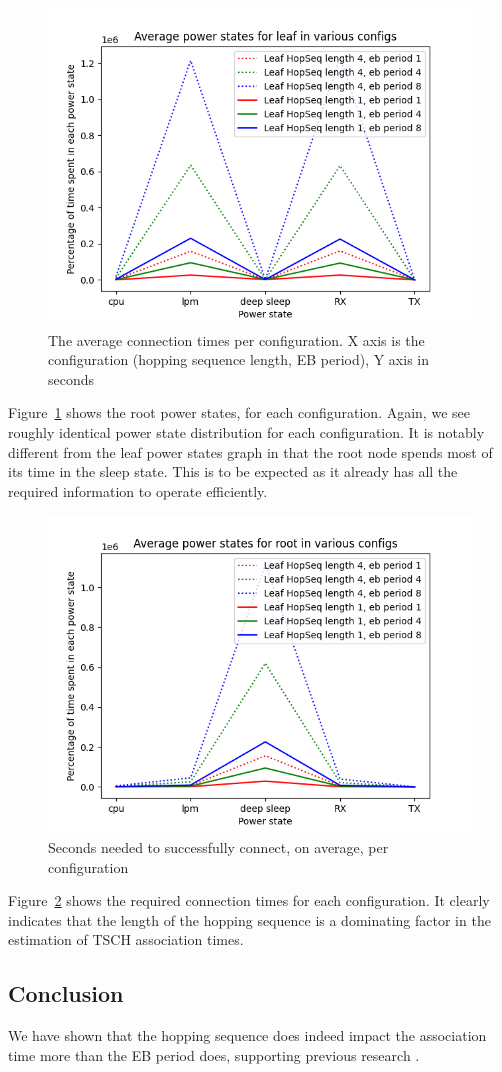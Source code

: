\documentclass[conference]{IEEEtran}
\newcommand{\figref}[1]{Figure~\ref{#1}}
\renewcommand\_{\textunderscore\allowbreak}
\begin{document}
\begin{figure}[htbp]
	\centering
	\includegraphics[width=.48\textwidth,keepaspectratio]{figures/leaf_powerstates}
	\caption{The average connection times per configuration. X axis is the configuration (hopping sequence length, EB period), Y axis in seconds}
	\label{fig:t2root}
\end{figure}

\figref{fig:t2root} shows the root power states, for each configuration. Again, we see roughly identical power state distribution for each configuration. It is notably different from the leaf power states graph in that the root node spends most of its time in the sleep state. This is to be expected as it already has all the required information to operate efficiently. 

\begin{figure}[htbp]
	\centering
	\includegraphics[width=.48\textwidth,keepaspectratio]{figures/root_powerstates}
	\caption{Seconds needed to successfully connect, on average, per configuration}
	\label{fig:t2times}
\end{figure}
\figref{fig:t2times} shows the required connection times for each configuration. It clearly indicates that the length of the hopping sequence is a dominating factor in the estimation of TSCH association times.


\subsection{Conclusion}
We have shown that the hopping sequence does indeed impact the association time more than the EB period does, supporting previous research \cite{JoinProcess}. 
\end{document}
